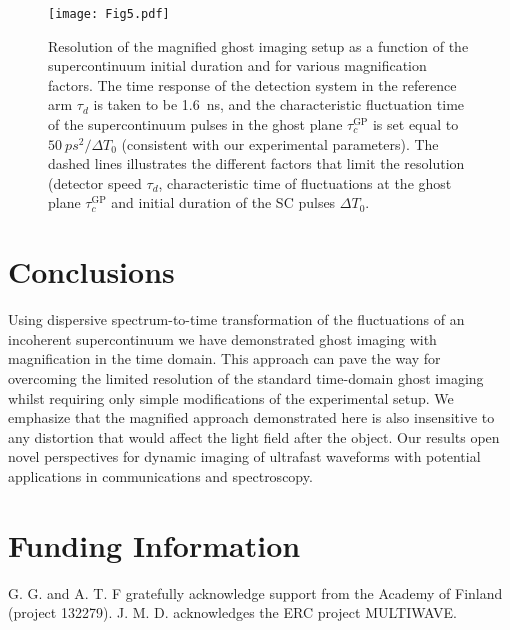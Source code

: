 \documentclass[aip,graphicx]{revtex4-1}
\begin{document}
\begin{figure}[ht]
	\texttt{[image: Fig5.pdf]}
	\caption{Resolution of the magnified ghost imaging setup as a function of the supercontinuum initial duration and for various magnification factors. The time response of the detection system in the reference arm $\tau_d$ is taken to be 1.6~ns, and the characteristic fluctuation time of the supercontinuum pulses in the ghost plane $\tau_c^{\text{GP}}$ is set equal to $50~ ps^2/\Delta T_0$ (consistent with our experimental parameters). The dashed lines illustrates the different factors that limit the resolution (detector speed $\tau_d$, characteristic time of fluctuations at the ghost plane $\tau_c^{\text{GP}}$ and initial duration of the SC pulses $\Delta T_0$.}
	\label{fig:resolution}
\end{figure}

\section{Conclusions}
Using dispersive spectrum-to-time transformation of the fluctuations of an incoherent supercontinuum we have demonstrated ghost imaging with magnification in the time domain. This approach can pave the way for overcoming the limited resolution of the standard time-domain ghost imaging whilst requiring only simple modifications of the experimental setup. We emphasize that the magnified approach demonstrated here is also insensitive to any distortion that would affect the light field after the object. Our results open novel perspectives for dynamic imaging of ultrafast waveforms with potential applications in communications and spectroscopy.
\section*{Funding Information}
G. G. and A. T. F gratefully acknowledge support from the Academy of Finland (project 132279). J. M. D. acknowledges the ERC project MULTIWAVE.



%
%
\end{document}
